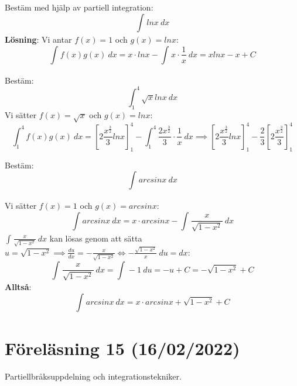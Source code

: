 \documentclass{report}
\begin{document}
\pagebreak
\ex{}
{
Bestäm med hjälp av partiell integration:
\begin{equation*}
\int_{}^{} lnx \: dx 
\end{equation*}
\textbf{Lösning}: Vi antar $ f(x) = 1 $ och $ g(x) = lnx $:
\begin{equation*}
\int_{}^{} f(x)g(x) \: dx = x \cdot lnx - \int_{}^{} x \cdot \frac{1}{x}  \: dx = xlnx-x + C    
\end{equation*}
}

\vspace{20pt}
\qs{}
{
Bestäm:
\begin{equation*}
\int_{1}^{4} \sqrt{x} lnx \: dx 
\end{equation*}
}
\sol Vi sätter $ f(x) = \sqrt{x}  $ och $ g(x) = lnx $:
\begin{equation*}
	\int_{1}^{4} f(x)g(x) \: dx = [2 \frac{x^{ \frac{3}{2} }}{3} lnx  ]_{1}^{4} - \int_{1}^{4} \frac{2x^{ \frac{3}{2} }}{3} \cdot \frac{1}{x}   \: dx \implies [2 \frac{x^{ \frac{3}{2} }}{3} lnx ]_{1}^{4}- \frac{2}{3} [2 \frac{x^{ \frac{3}{2} }}{3}]_{1}^{4}   
\end{equation*}

\vspace{20pt}
\qs{}
{
Bestäm:
\begin{equation*}
\int_{}^{} arcsinx \: dx 
\end{equation*}
}

\sol Vi sätter $ f(x) = 1 $ och $ g(x) = arcsinx $:
\begin{equation*}
\int_{}^{} arcsinx \: dx = x \cdot arcsinx - \int_{}^{} \frac{x}{ \sqrt{1 - x^2}  }  \: dx  
\end{equation*}
$ \int_{}^{} \frac{x}{ \sqrt{1 - x^2} }  \: dx $ kan lösas genom att sätta $ u = \sqrt{1 - x^2}  \implies \frac{du}{dx} = -\frac{x}{ \sqrt{1 - x^2}  } \iff - \frac{ \sqrt{1-x^2} }{x}\:du =dx   $:
\begin{equation*}
\int_{}^{} \frac{x}{ \sqrt{1-x^2} }  \: dx = \int_{}^{} -1 \: du = -u + C = - \sqrt{1-x^2} + C  
\end{equation*}
\textbf{Alltså}:
\begin{equation*}
\int_{}^{} arcsinx \: dx = x \cdot arcsinx + \sqrt{1 - x^2} + C 
\end{equation*}

\pagebreak
\section{Föreläsning 15  (16/02/2022)}
Partiellbråksuppdelning och integrationstekniker.\\\\
\end{document}
